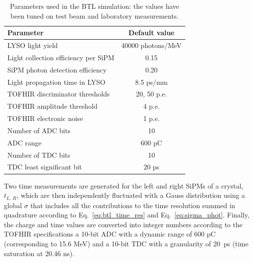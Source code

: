 \begin{table}
  \begin{center}  
    \begin{tabular}{ l | c }
      \hline
      Parameter & Default value \\
      \hline
      LYSO light yield                     & 40000 photons/MeV \\
      Light collection efficiency per SiPM & 0.15  \\ 
      SiPM photon detection efficiency     & 0.20  \\
      Light propagation time in LYSO       & 8.5 ps/mm \\
      \hline
      TOFHIR discriminator thresholds      & 20, 50 p.e. \\
      TOFHIR amplitude threshold           & 4 p.e. \\
      TOFHIR electronic noise              & 1 p.e. \\ 
      Number of ADC bits                   & 10 \\
      ADC range                            & 600 pC \\  
      Number of TDC bits                   & 10 \\
      TDC least significant bit            & 20 ps \\
    \hline
    \end{tabular}
    \caption{Parameters used in the BTL simulation: the values have been tuned on test beam and laboratory measurements.
    \label{tab:sim_parameters}}
  \end{center}
\end{table}

Two time measurements are generated for the left and right SiPMs of a
crystal, $t_{L,\,R}$, which are then independently fluctuated with a
Gauss distribution using a global $\sigma$ that includes all the 
contributions to the time resolution summed in quadrature according to
Eq.~\ref{eq:btl_time_res} and Eq.~\ref{eq:sigma_phot}. 
Finally, the charge and time values are converted into integer numbers according to the TOFHIR specifications 
a 10-bit ADC with a dynamic range of 600 pC (corresponding to 15.6 MeV) and a 10-bit TDC with a granularity of 20~ps
(time saturation at 20.46 ns).

